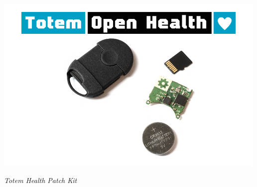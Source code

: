 \documentclass[conference]{IEEEtran}
\begin{document}
\begin{center}
    \includegraphics[scale=2.5]{totem}
    \begin{minipage}{0.6\textwidth}
    \footnotesize
    \emph{Totem Health Patch Kit}
    \end{minipage}
\end{center}
\end{document}
